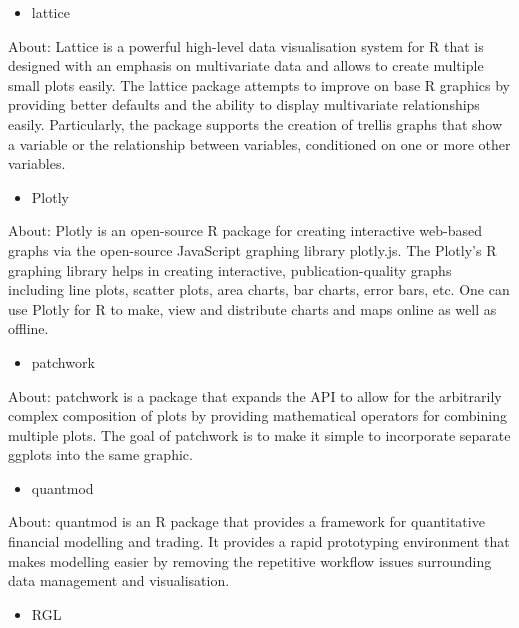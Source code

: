 \documentclass[
]{report}
\providecommand{\tightlist}{%
  \setlength{\itemsep}{0pt}\setlength{\parskip}{0pt}}
\begin{document}
\begin{itemize}
\tightlist
\item
  lattice
\end{itemize}

About: Lattice is a powerful high-level data visualisation system for R that is designed with an emphasis on multivariate data and allows to create multiple small plots easily. The lattice package attempts to improve on base R graphics by providing better defaults and the ability to display multivariate relationships easily. Particularly, the package supports the creation of trellis graphs that show a variable or the relationship between variables, conditioned on one or more other variables.

\begin{itemize}
\tightlist
\item
  Plotly
\end{itemize}

About: Plotly is an open-source R package for creating interactive web-based graphs via the open-source JavaScript graphing library plotly.js. The Plotly's R graphing library helps in creating interactive, publication-quality graphs including line plots, scatter plots, area charts, bar charts, error bars, etc. One can use Plotly for R to make, view and distribute charts and maps online as well as offline.

\begin{itemize}
\tightlist
\item
  patchwork
\end{itemize}

About: patchwork is a package that expands the API to allow for the arbitrarily complex composition of plots by providing mathematical operators for combining multiple plots. The goal of patchwork is to make it simple to incorporate separate ggplots into the same graphic.

\begin{itemize}
\tightlist
\item
  quantmod
\end{itemize}

About: quantmod is an R package that provides a framework for quantitative financial modelling and trading. It provides a rapid prototyping environment that makes modelling easier by removing the repetitive workflow issues surrounding data management and visualisation.

\begin{itemize}
\tightlist
\item
  RGL
\end{itemize}
\end{document}
